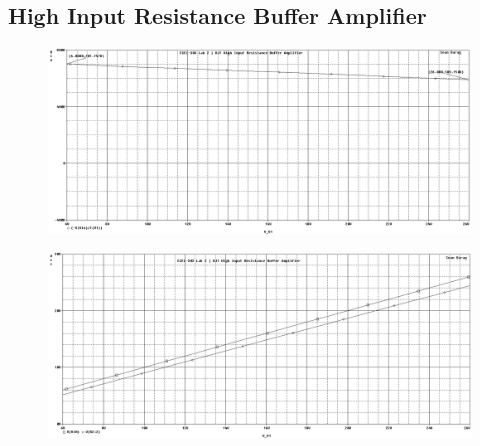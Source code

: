 \subsection{High Input Resistance Buffer Amplifier}
\begin{figure}[H]
	\centering
	\includegraphics[width=\pwidth]{img/plot/bjtPlotR.PNG}
	\parbox{\pwidth}{
	\caption{}
	\label{fig:bjtPlotR}}
\end{figure}

\begin{figure}[H]
	\centering
	\includegraphics[width=\pwidth]{img/plot/bjtPlotV.PNG}
	\parbox{\pwidth}{
	\caption{}
	\label{fig:bjtPlotV}}
\end{figure}
